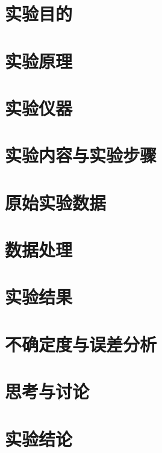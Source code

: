 \documentclass[UTF8,a4paper,12pt]{ctexart}
\title{\ExperimentTitle}
\author{\ReportAuthor\quad\StudentID}
\date{\ExperimentDate}
\begin{document}
\pagestyle{plain}
\maketitle
\section{实验目的}
\section{实验原理}
\section{实验仪器}
\section{实验内容与实验步骤}
\section{原始实验数据}
\section{数据处理}
\section{实验结果}
\section{不确定度与误差分析}
\section{思考与讨论}
\section{实验结论}
\end{document}
